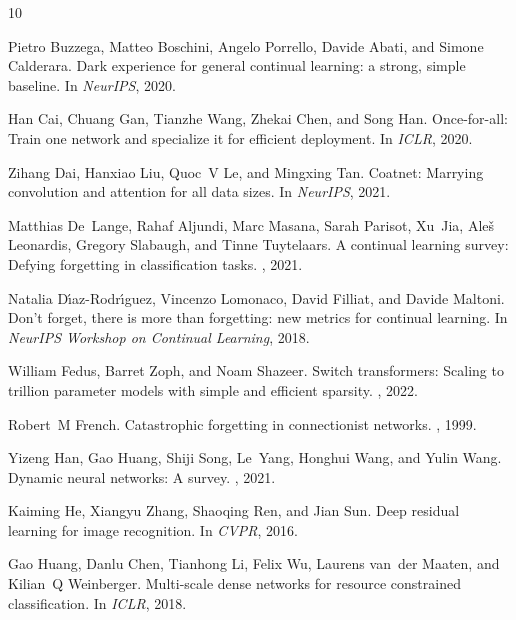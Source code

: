 \documentclass[11pt, a4paper]{article}
\begin{document}

\begin{thebibliography}{10}

Pietro Buzzega, Matteo Boschini, Angelo Porrello, Davide Abati, and Simone Calderara.
\newblock Dark experience for general continual learning: a strong, simple baseline.
\newblock In {\em NeurIPS}, 2020.

Han Cai, Chuang Gan, Tianzhe Wang, Zhekai Chen, and Song Han.
\newblock Once-for-all: Train one network and specialize it for efficient deployment.
\newblock In {\em ICLR}, 2020.

Zihang Dai, Hanxiao Liu, Quoc~V Le, and Mingxing Tan.
\newblock Coatnet: Marrying convolution and attention for all data sizes.
\newblock In {\em NeurIPS}, 2021.

Matthias De~Lange, Rahaf Aljundi, Marc Masana, Sarah Parisot, Xu~Jia, Ale{\v{s}} Leonardis, Gregory Slabaugh, and Tinne Tuytelaars.
\newblock A continual learning survey: Defying forgetting in classification tasks.
, 2021.

Natalia D{\'\i}az-Rodr{\'\i}guez, Vincenzo Lomonaco, David Filliat, and Davide Maltoni.
\newblock Don't forget, there is more than forgetting: new metrics for continual learning.
\newblock In {\em NeurIPS Workshop on Continual Learning}, 2018.

William Fedus, Barret Zoph, and Noam Shazeer.
\newblock Switch transformers: Scaling to trillion parameter models with simple and efficient sparsity.
, 2022.

Robert~M French.
\newblock Catastrophic forgetting in connectionist networks.
, 1999.

Yizeng Han, Gao Huang, Shiji Song, Le~Yang, Honghui Wang, and Yulin Wang.
\newblock Dynamic neural networks: A survey.
, 2021.

Kaiming He, Xiangyu Zhang, Shaoqing Ren, and Jian Sun.
\newblock Deep residual learning for image recognition.
\newblock In {\em CVPR}, 2016.

Gao Huang, Danlu Chen, Tianhong Li, Felix Wu, Laurens van~der Maaten, and Kilian~Q Weinberger.
\newblock Multi-scale dense networks for resource constrained classification.
\newblock In {\em ICLR}, 2018.


\end{thebibliography}
\end{document}
